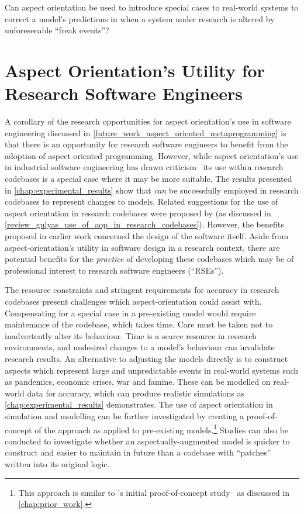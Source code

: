 \begin{researchquestion}
Can aspect orientation be used to introduce special cases to real-world systems
to correct a model's predictions in when a system under research is altered by
unforeseeable ``freak events''?
\end{researchquestion}




\section{Aspect Orientation's Utility for Research Software Engineers}
\label{future_work_aop_for_rses}

A corollary of the research opportunities for aspect orientation's use in
software engineering discussed in
\cref{future_work_aspect_oriented_metaprogramming} is that there is an
opportunity for research software engineers to benefit from the adoption of
aspect oriented programming. However, while aspect orientation's use in
industrial software engineering has drawn
criticism~\cite{steimann06paradoxical,przybylek2010wrong,Constantinides04aopconsidered}
its use within research codebases is a special case where it may be more
suitable. The results presented in \cref{chap:experimental_results} show that
\aop{} \emph{can} be successfully employed in research codebases to represent
changes to models. Related suggestions for the use of aspect orientation in
research codebases were proposed by \citeauthor{gulyas1999use} (as discussed in
\cref{review_gulyas_use_of_aop_in_research_codebases}). However, the benefits
proposed in earlier work concerned the design of the software itself. Aside from
aspect-orientation's utility in software design in a research context, there are
potential benefits for the \emph{practice} of developing these codebases which
may be of professional interest to research software engineers (``RSEs'').


The resource constraints and stringent requirements for accuracy in research
codebases present challenges which aspect-orientation could assist with.
Compensating for a special case in a pre-existing model would require
maintenance of the codebase, which takes time. Care must be taken not to
inadvertently alter its behaviour. Time is a scarce resource in research
environments, and undesired changes to a model's behaviour can invalidate
research results. An alternative to adjusting the models directly is to
construct aspects which represent large and unpredictable events in real-world
systems such as pandemics, economic crises, war and famine. These can be
modelled on real-world data for accuracy, which can produce realistic
simulations as \cref{chap:experimental_results} demonstrates. The use of aspect
orientation in simulation and modelling can be further investigated by creating
a proof-of-concept of the approach as applied to pre-existing
models.\footnote{This approach is similar to \pydysofu{}'s initial proof-of-concept
study~\cite{wallis2018caise} as discussed in \cref{chap:prior_work}.} Studies
can also be conducted to investigate whether an aspectually-augmented model is
quicker to construct and easier to maintain in future than a codebase with
``patches'' written into its original logic.

